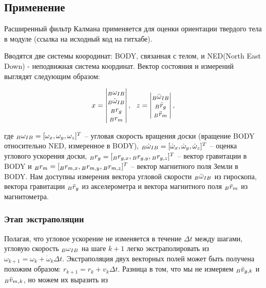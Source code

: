 \documentclass[12pt,a4paper]{article}
\begin{document}
\subsection{Применение}

Расширенный фильтр Калмана применяется для оценки ориентации твердого тела в модуле  (ссылка на исходный код на гитхабе).

Вводятся две системы коородинат: BODY, связанная с телом, и NED(North East Down) - неподвижная система координат.
Вектор состояния и измерений выглядят следующим образом:

\begin{equation*}
	x = 
	\begin{vmatrix}
		{\vphantom \omega}_B \omega_{IB} \\
		{\vphantom \omega}_B \dot{\omega}_{IB} \\
		{\vphantom r}_B r_g \\
		{\vphantom r}_B r_m \\
	\end{vmatrix}, \ \
	z = 
	\begin{vmatrix}
		{\vphantom \omega}_B \bar{\omega}_{IB} \\
		{\vphantom r}_B \bar{r}_g \\
		{\vphantom r}_B \bar{r}_m \\
	\end{vmatrix}, 
\end{equation*}

где ${\vphantom \omega}_B \omega_{IB} = [\omega_x, \omega_y, \omega_z]^T$ -- угловая скорость вращения доски (вращение BODY относительно NED, измеренное в BODY), ${\vphantom \omega}_B \dot{\omega}_{IB} = [\dot\omega_x, \dot\omega_y, \dot\omega_z]^T$ -- оценка углового ускорения доски, ${\vphantom r}_B r_g = [{\vphantom r}_B r_{g,x}, {\vphantom r}_B r_{g,y}, {\vphantom r}_B r_{g,z}]^T$ -- вектор гравитации в BODY и ${\vphantom r}_B r_m = [{\vphantom r}_B r_{m,x}, {\vphantom r}_B r_{m,y}, {\vphantom r}_B r_{m,z}]^T$ -- вектор магнитного поля Земли в BODY. Нам доступны измерения вектора угловой скорости ${\vphantom \omega}_B \bar{\omega}_{IB}$ из гироскопа, вектора гравитации ${\vphantom r}_B \bar{r}_g$ из акселерометра и вектора магнитного поля ${\vphantom r}_B \bar{r}_m $ из магнитометра.

\subsubsection{Этап экстраполяции}

Полагая, что угловое ускорение не изменяется в течение $\Delta t$ между шагами, угловую скорость ${\vphantom \omega}_B \omega_{IB}$ на шаге $k+1$ легко экстраполировать из $\omega_{k+1} = \omega_k + \dot\omega_k \Delta t$. Экстраполяция двух векторных полей может быть получена похожим образом: $r_{k+1} = r_k + v_k \Delta t$. Разница в том, что мы не измеряем ${\vphantom v}_B \bar{v}_{g,k}$ и ${\vphantom v}_B \bar{v}_{m,k}$, но можем их выразить из
\end{document}
